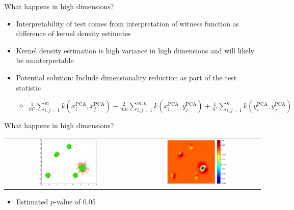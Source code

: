 \begin{frame}{What happens in high dimensions?}
  \begin{itemize}
    \item Interpretability of test comes from interpretation of witness function as difference of kernel density estimates
    \vspace{\baselineskip}
    \pause
    \item Kernel density estimation is high variance in high dimensions and will likely be uninterpretable
    \vspace{\baselineskip}
    \pause
    \item Potential solution: Include dimensionality reduction as part of the test statistic
    \begin{itemize}
      \item $\frac{1}{m^2}\sum_{i,j=1}^{m}k(x_i^{\textrm{PCA}},x_j^{\textrm{PCA}}) - \frac{2}{mn}\sum_{i,j=1}^{m,n}k(x_i^{\textrm{PCA}},y_j^{\textrm{PCA}}) + \frac{1}{n^2}\sum_{i,j=1}^{n}k(y_i^{\textrm{PCA}},y_j^{\textrm{PCA}})$
    \end{itemize}
  \end{itemize}
\end{frame}

\begin{frame}{What happens in high dimensions?}
  \begin{center}
  \begin{tabular}{cc}
    \includegraphics[width=0.48\textwidth]{figures/high_mog_pca} &
    \pause
    \includegraphics[width=0.48\textwidth]{figures/high_mog_witness}
  \end{tabular}
  \end{center}
  \pause
  \begin{itemize}
    \item Estimated $p$-value of 0.05
  \end{itemize}
\end{frame}

